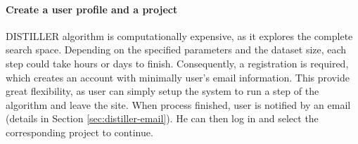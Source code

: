 \paragraph{Create a user profile and a project}
DISTILLER algorithm is computationally expensive, as it explores the complete
search space. Depending on the specified parameters and the dataset size, each
step could take hours or days to finish.  
%
Consequently, a registration is required, which creates an account with
minimally user's email information.  This provide great flexibility, as user
can simply setup the system to run a step of the algorithm and leave the site.
When process finished, user is notified by an email (details in Section
\ref{sec:distiller-email}).  He can then log in and select the corresponding
project to continue.



